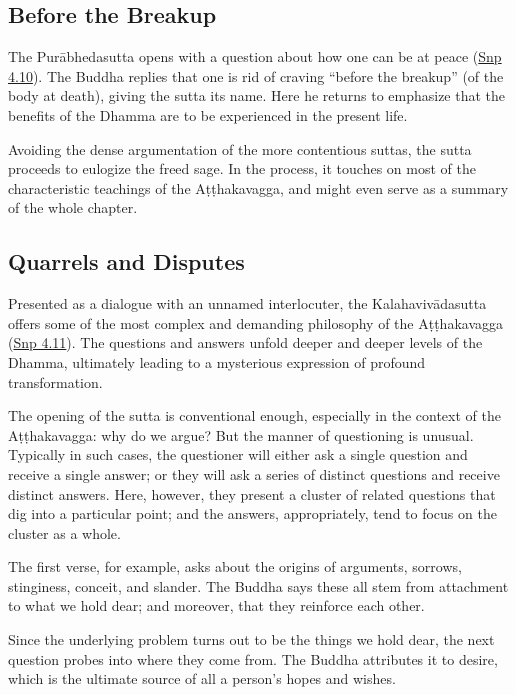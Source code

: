 \documentclass[12pt,openany]{book}%
\begin{document}
\subsection*{Before the Breakup}

The \textsanskrit{Purābhedasutta} opens with a question about how one can be at peace (\href{https://suttacentral.net/snp4.10/en/sujato}{Snp 4.10}). The Buddha replies that one is rid of craving “before the breakup” (of the body at death), giving the sutta its name. Here he returns to emphasize that the benefits of the Dhamma are to be experienced in the present life.

Avoiding the dense argumentation of the more contentious suttas, the sutta proceeds to eulogize the freed sage. In the process, it touches on most of the characteristic teachings of the \textsanskrit{Aṭṭhakavagga}, and might even serve as a summary of the whole chapter.

\subsection*{Quarrels and Disputes}

Presented as a dialogue with an unnamed interlocuter, the \textsanskrit{Kalahavivādasutta} offers some of the most complex and demanding philosophy of the \textsanskrit{Aṭṭhakavagga} (\href{https://suttacentral.net/snp4.11/en/sujato}{Snp 4.11}). The questions and answers unfold deeper and deeper levels of the Dhamma, ultimately leading to a mysterious expression of profound transformation.

The opening of the sutta is conventional enough, especially in the context of the \textsanskrit{Aṭṭhakavagga}: why do we argue? But the manner of questioning is unusual. Typically in such cases, the questioner will either ask a single question and receive a single answer; or they will ask a series of distinct questions and receive distinct answers. Here, however, they present a cluster of related questions that dig into a particular point; and the answers, appropriately, tend to focus on the cluster as a whole.

The first verse, for example, asks about the origins of arguments, sorrows, stinginess, conceit, and slander. The Buddha says these all stem from attachment to what we hold dear; and moreover, that they reinforce each other.

Since the underlying problem turns out to be the things we hold dear, the next question probes into where they come from. The Buddha attributes it to desire, which is the ultimate source of all a person’s hopes and wishes.
\end{document}
